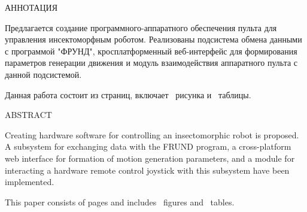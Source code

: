 \begin{center}
	АННОТАЦИЯ
\end{center}

Предлагается создание программного-аппаратного обеспечения пульта для управления
инсектоморфным роботом. Реализованы подсистема обмена данными с программой "ФРУНД"{}, 
кросплатформенный веб-интерфейс для формирования параметров генерации
движения и модуль взаимодействия аппаратного пульта с данной подсистемой.

Данная работа состоит из \pageref{LastPage} страниц, включает \totalfigures ~рисунка и
\totaltables ~таблицы. 

\begin{center}
	ABSTRACT
\end{center}

Creating hardware software for controlling an insectomorphic robot is proposed. A subsystem for exchanging
data with the FRUND program, a cross-platform web interface for formation of motion generation parameters, and a module for
interacting a hardware remote control joystick with this subsystem have been implemented.

This paper consists of \pageref{LastPage} pages and includes \totalfigures ~figures and
\totaltables ~tables.